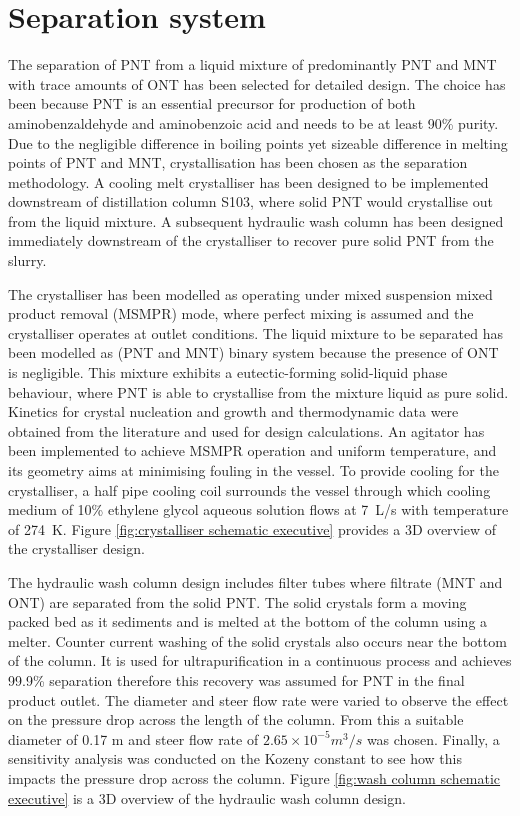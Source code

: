 \section*{Separation system}

The separation of PNT from a liquid mixture of predominantly PNT and MNT with trace amounts of ONT has been selected for detailed design. The choice has been because PNT is an essential precursor for production of both aminobenzaldehyde and aminobenzoic acid and needs to be at least 90\% purity. Due to the negligible difference in boiling points yet sizeable difference in melting points of PNT and MNT, crystallisation has been chosen as the separation methodology. A cooling melt crystalliser has been designed to be implemented downstream of distillation column S103, where solid PNT would crystallise out from the liquid mixture. A subsequent hydraulic wash column has been designed immediately downstream of the crystalliser to recover pure solid PNT from the slurry. 


The crystalliser has been modelled as operating under mixed suspension mixed product removal (MSMPR) mode, where perfect mixing is assumed and the crystalliser operates at outlet conditions. The liquid mixture to be separated has been modelled as (PNT and MNT) binary system because the presence of ONT is negligible. This mixture exhibits a eutectic-forming solid-liquid phase behaviour, where PNT is able to crystallise from the mixture liquid as pure solid. Kinetics for crystal nucleation and growth and thermodynamic data were obtained from the literature and used for design calculations. An agitator has been implemented to achieve MSMPR operation and uniform temperature, and its geometry aims at minimising fouling in the vessel. To provide cooling for the crystalliser, a half pipe cooling coil surrounds the vessel through which cooling medium of 10\% ethylene glycol aqueous solution flows at \SI{7}{L/s} with temperature of \SI{274}{K}. Figure \ref{fig:crystalliser schematic executive} provides a 3D overview of the crystalliser design.


The hydraulic wash column design includes filter tubes where filtrate (MNT and ONT) are separated from the solid PNT. The solid crystals form a moving packed bed as it sediments and is melted at the bottom of the column using a melter. Counter current washing of the solid crystals also occurs near the bottom of the column. It is used for ultrapurification in a continuous process and achieves 99.9\% separation therefore this recovery was assumed for PNT in the final product outlet. The diameter and steer flow rate were varied to observe the effect on the pressure drop across the length of the column. From this a suitable diameter of 0.17 m and steer flow rate  of $2.65 \times 10^{-5} m^{3}/s$ was chosen. Finally, a sensitivity analysis was conducted on the Kozeny constant to see how this impacts the pressure drop across the column. Figure \ref{fig:wash column schematic executive} is a 3D overview of the hydraulic wash column design.



